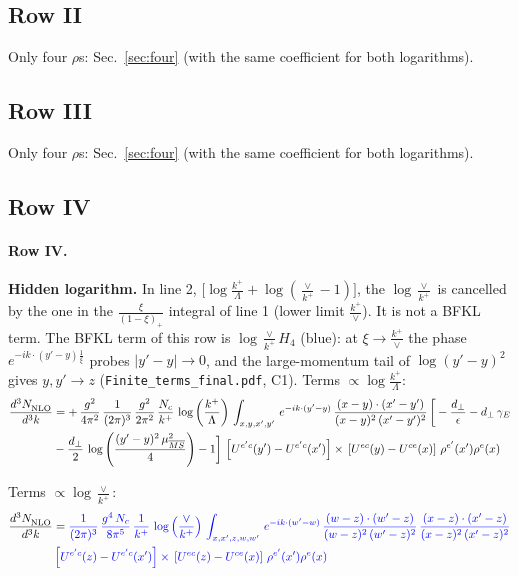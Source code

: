 \documentclass[10pt]{article}
\numberwithin{equation}{section}
\newcommand{\new}[1]{{\color{blue}#1}}
\newcommand{\nc}{\color{blue}}
\begin{document}
\subsection{Row II}
Only four $\rho$\textquotesingle s: Sec.~\ref{sec:four} (with the same coefficient for both logarithms).
\subsection{Row III}
Only four $\rho$\textquotesingle s: Sec.~\ref{sec:four} (with the same coefficient for both logarithms).
\subsection{Row IV}
\paragraph{Row IV.}
\textbf{Hidden logarithm.} In line 2, $\big[\log\frac{k^+}{\Lambda}+\log(\frac{\vee}{k^+}-1)\big]$, the $\log\frac{\vee}{k^+}$ is cancelled by the one in the $\frac{\xi}{(1-\xi)_+}$ integral of line 1 (lower limit $\frac{k^+}{\vee}$). It is not a BFKL term. The BFKL term of this row is \new{$\log\frac{\vee}{k^+}H_4$} (blue): at $\xi\to\frac{k^+}{\vee}$ the phase $e^{-ik\cdot(y'-y)\frac1\xi}$ probes $|y'-y|\to0$, and the large-momentum tail of $\log(y'-y)^2$ gives $y,y'\to z$ (\texttt{Finite\_terms\_final.pdf}, C1).
\noindent Terms $\propto\log\frac{k^+}{\Lambda}$:
\begin{align}
    \frac{d^{3}N_{\rm NLO}^{\rm}}{d^{3}k}  & =    +\, \frac{g^{2}}{4\pi^{2}}\, \frac{1}{(2\pi)^{3}}\,\frac{g^{2}}{2\pi^{2}}\, \frac{N_{c}}{k^{+}}\,\log{\left(\frac{k^{+}}{\Lambda}\right)}\,\int_{x,y,x',y'}\,e^{-ik\cdot (y'-y)}\,\frac{(x-y)\cdot (x'-y')}{(x-y)^{2}\,(x'-y')^{2}}\,\bigg[-\frac{d_{\perp}}{\epsilon}-d_{\perp}\,\gamma_{E}\notag \\ & -\frac{d_{\perp}}{2}\,\log{\left(\frac{(y'-y)^{2}\,\mu^{2}_{\overline{MS}}}{4}\right)}-1\bigg]\,\left[U^{e'c}(y') - U^{e'c}(x')\right] \times\, \left[U^{ec}(y) - U^{ce}(x)\right]\, \rho^{e'}(x') \rho^{e}(x) \label{eq:J:G2IV}
\end{align}

\noindent Terms $\propto\log\frac{\vee}{k^+}$:
\begin{align}
    \frac{d^{3}N_{\rm NLO}^{\rm}}{d^{3}k}  & =  \nc \frac{1}{(2\pi)^{3}}\,\frac{g^{4}\,N_{c}}{8\pi^{5}}\,\frac{1}{k^{+}}\,\log{\left(\frac{\vee}{k^{+}}\right)}\,\int_{x,x',z,w,w'}\,e^{-ik\cdot (w'-w)}\,\frac{(w-z)\cdot(w'-z)}{(w-z)^{2}\,(w'-z)^{2}}\,\frac{(x-z)\cdot(x'-z)}{(x-z)^{2}\,(x'-z)^{2}}\notag \\ & \nc  \left[U^{e'c}(z) - U^{e'c}(x')\right] \times\, \left[U^{ec}(z) - U^{ce}(x)\right]\, \rho^{e'}(x') \rho^{e}(x) \label{eq:B:G2IV}
\end{align}
\end{document}
